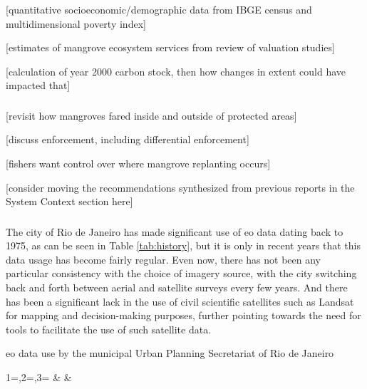 \subsubsection{} 

[quantitative socioeconomic/demographic data from IBGE census and multidimensional poverty index]

[estimates of mangrove ecosystem services from review of valuation studies]

[calculation of year 2000 carbon stock, then how changes in extent could have impacted that]

\subsubsection{} 

[revisit how mangroves fared inside and outside of protected areas]

[discuss enforcement, including differential enforcement]

[fishers want control over where mangrove replanting occurs]

[consider moving the recommendations synthesized from previous reports in the System Context section here]

\subsubsection{} 

The city of Rio de Janeiro has made significant use of \ac{eo} data dating back to 1975, as can be seen in Table \ref{tab:history}, but it is only in recent years that this data usage has become fairly regular. Even now, there has not been any particular consistency with the choice of imagery source, with the city switching back and forth between aerial and satellite surveys every few years. And there has been a significant lack in the use of civil scientific satellites such as Landsat for mapping and decision-making purposes, further pointing towards the need for tools to facilitate the use of such satellite data.

\begin{table}[H]\centering
	\caption[EO data use by Rio de Janeiro]{\ac{eo} data use by the  municipal Urban Planning Secretariat of Rio de Janeiro}\label{tab:history}
	\fontsize{8}{10}\selectfont
		{1=\year,2=\type,3=\platform}
		{\year & \type & \platform}
\end{table}

